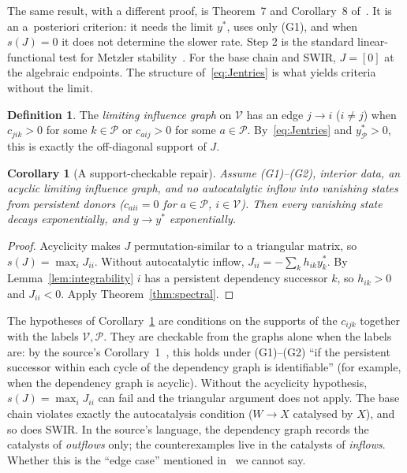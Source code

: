 \documentclass[11pt,a4paper]{article}
\newtheorem{corollary}[theorem]{Corollary}
\theoremstyle{definition}\newtheorem{definition}[theorem]{Definition}
\theoremstyle{remark}\newtheorem{remark}[theorem]{Remark}
\newcommand{\Vs}{\mathcal V}
\newcommand{\Ps}{\mathcal P}
\begin{document}
The same result, with a different proof, is Theorem~7 and Corollary~8
of~\cite{EPprior}. It is an a~posteriori criterion: it needs the limit
$y^*$, uses only (G1), and when $s(J)=0$ it does not determine the slower rate. Step 2 is
the standard linear-functional test for Metzler
stability~\cite{Rantzer,FarinaRinaldi}. For the base chain and SWIR,
$J=[0]$ at the algebraic endpoints. The structure of~\eqref{eq:Jentries}
is what yields criteria without the limit.

\begin{definition}
The \emph{limiting influence graph} on $\Vs$ has an edge $j\to i$
($i\ne j$) when $c_{jik}>0$ for some $k\in\Ps$ or $c_{aij}>0$ for some
$a\in\Ps$. By~\eqref{eq:Jentries} and $y^*_\Ps>0$, this is exactly the
off-diagonal support of $J$.
\end{definition}

\begin{corollary}[A support-checkable repair]
\label{cor:graph}
Assume (G1)--(G2), interior data, an acyclic limiting influence graph,
and no autocatalytic inflow into vanishing states from persistent
donors ($c_{aii}=0$ for $a\in\Ps$, $i\in\Vs$). Then every vanishing state
decays exponentially, and $y\to y^*$ exponentially.
\end{corollary}
\begin{proof}
Acyclicity makes $J$ permutation-similar to a triangular matrix, so
$s(J)=\max_iJ_{ii}$. Without autocatalytic inflow,
$J_{ii}=-\sum_kh_{ik}y_k^*$. By Lemma~\ref{lem:integrability} $i$ has a
persistent dependency successor $k$, so $h_{ik}>0$ and $J_{ii}<0$. Apply
Theorem~\ref{thm:spectral}.
\end{proof}
The hypotheses of Corollary~\ref{cor:graph} are conditions on the
supports of the $c_{ijk}$ together with the labels $\Vs,\Ps$. They are
checkable from the graphs alone when the labels are: by the source's
Corollary~1~\cite[p.~22]{CCM}, this holds under (G1)--(G2) ``if the
persistent successor within each cycle of the dependency graph is
identifiable'' (for example, when the dependency graph is acyclic).
Without the acyclicity hypothesis, $s(J)=\max_iJ_{ii}$ can fail and the
triangular argument does not apply. The base chain violates exactly the
autocatalysis condition ($W\to X$ catalysed by $X$), and so does SWIR.
In the source's language, the dependency graph records the catalysts of
\emph{outflows} only; the counterexamples live in the catalysts of
\emph{inflows}. Whether this is the ``edge case'' mentioned
in~\cite[p.~32]{CCM} we cannot say.
\end{document}
